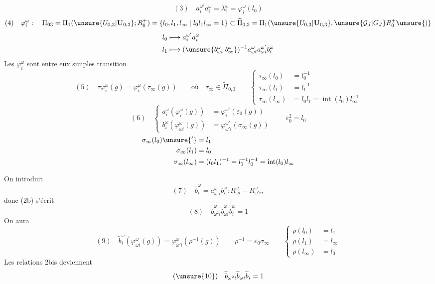 \[
(3)\quad a_i^{\omega'}a_i^\omega=\lambda_i^\omega=\varphi_i^\omega(l_0)
\]
\[
(4)\quad \varphi_i^\omega:\quad
\Pi_{03}=\Pi_1(\unsure{U_{0,3}|\mathbf U_{0,3}};R_0^+)=\{l_0,l_1,l_\infty\mid l_0l_1l_\infty=1\}
\subset\widetilde\Pi_{0,3}=\Pi_1(\unsure{U_{0,3}|\mathbf U_{0,3}},\unsure{\mathcal G_J|G_J} R_0^+\unsure{)}
\]
\[
\begin{aligned}
l_0&\longmapsto a_i^{\omega'}a_i^\omega\\
l_1&\longmapsto (\unsure{b_{\omega i}^\omega|b_\infty^\omega})^{-1}a_{\omega i}^{\omega}a_{\omega i}^{\omega'}b_i^\omega
\end{aligned}
\]
Les $\varphi_i^\omega$ sont  entre eux   simples  transition
\[
(5)\quad\tau\varphi_i^\omega(g)=\varphi_i^\omega(\tau_\infty(g))
\qquad\text{où}\quad\tau_\infty\in\widetilde\Pi_{0,3}
\qquad\left\{\begin{aligned}
\tau_\infty(l_0)&=l_0^{-1}\\
\tau_\infty(l_1)&=l_1^{-1}\\
\tau_\infty(l_\infty)&=l_0l_1=\operatorname{int}(l_0)l_\infty^{-1}
\end{aligned}\right.
\]
\[
(6)\quad\left\{\begin{aligned}
a_i^\omega(\varphi_i^\omega(g))&=\varphi_i^{\omega'}(\varepsilon_0(g))\\
b_i^\omega(\varphi_{\omega i}^\omega(g))&=\varphi_{\omega'i}^{\omega'}(\sigma_\infty(g))
\end{aligned}\right.
\qquad\varepsilon_0^2=l_0
\]
\[
\begin{aligned}
\sigma_\infty(l_0)\unsure{'}&=l_1\\
\sigma_\infty(l_1)&=l_0\\
\sigma_\infty(l_\infty)&=(l_0l_1)^{-1}=l_1^{-1}l_0^{-1}=\operatorname{int}(l_0)l_\infty
\end{aligned}
\]

On introduit
\[
(7)\quad\widetilde b_i^\omega=a_{\omega'i}^{\omega'}b_i^\omega:
R_{\omega i}^\omega\mathbin{-}R_{\omega'i}^\omega,
\]
donc (2b) s'écrit
\[
(8)\quad\widetilde b_{\omega^2i}^\omega\widetilde b_{\omega i}^\omega\widetilde b_i^\omega=1
\]
On aura
\[
(9)\quad\widetilde b_i^\omega(\varphi_{\omega i}^\omega(g))=\varphi_{\omega'i}^\omega(\rho^{-1}(g))
\qquad\rho^{-1}=\varepsilon_0\sigma_\infty
\qquad\left\{\begin{aligned}
\rho(l_0)&=l_1\\
\rho(l_1)&=l_\infty\\
\rho(l_\infty)&=l_0
\end{aligned}\right.
\]
Les relations 2bis deviennent
\[
(\unsure{10})\quad\widetilde b_{\omega^2i}\widetilde b_{\omega i}\widetilde b_i=1
\]
